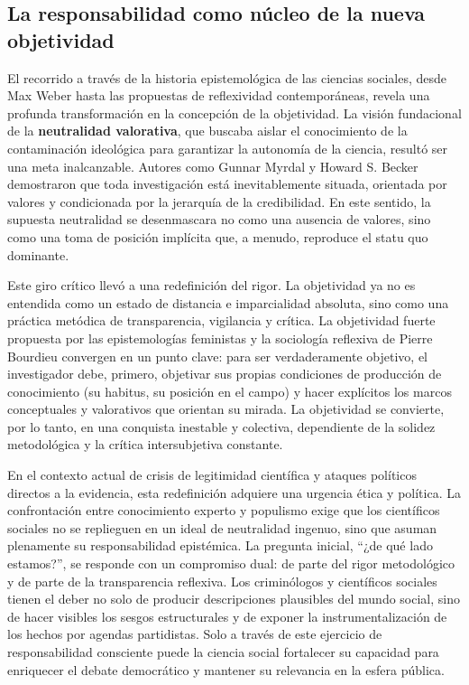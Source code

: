 \documentclass[
  spanish,
  letterpaper,
  DIV=11,
  numbers=noendperiod]{scrreprt}
\begin{document}
\subsection{La responsabilidad como núcleo de la nueva
objetividad}\label{la-responsabilidad-como-nuxfacleo-de-la-nueva-objetividad}

El recorrido a través de la historia epistemológica de las ciencias
sociales, desde Max Weber hasta las propuestas de reflexividad
contemporáneas, revela una profunda transformación en la concepción de
la objetividad. La visión fundacional de la \textbf{neutralidad
valorativa}, que buscaba aislar el conocimiento de la contaminación
ideológica para garantizar la autonomía de la ciencia, resultó ser una
meta inalcanzable. Autores como Gunnar Myrdal y Howard S. Becker
demostraron que toda investigación está inevitablemente situada,
orientada por valores y condicionada por la jerarquía de la
credibilidad. En este sentido, la supuesta neutralidad se desenmascara
no como una ausencia de valores, sino como una toma de posición
implícita que, a menudo, reproduce el statu quo dominante.

Este giro crítico llevó a una redefinición del rigor. La objetividad ya
no es entendida como un estado de distancia e imparcialidad absoluta,
sino como una práctica metódica de transparencia, vigilancia y crítica.
La objetividad fuerte propuesta por las epistemologías feministas y la
sociología reflexiva de Pierre Bourdieu convergen en un punto clave:
para ser verdaderamente objetivo, el investigador debe, primero,
objetivar sus propias condiciones de producción de conocimiento (su
habitus, su posición en el campo) y hacer explícitos los marcos
conceptuales y valorativos que orientan su mirada. La objetividad se
convierte, por lo tanto, en una conquista inestable y colectiva,
dependiente de la solidez metodológica y la crítica intersubjetiva
constante.

En el contexto actual de crisis de legitimidad científica y ataques
políticos directos a la evidencia, esta redefinición adquiere una
urgencia ética y política. La confrontación entre conocimiento experto y
populismo exige que los científicos sociales no se replieguen en un
ideal de neutralidad ingenuo, sino que asuman plenamente su
responsabilidad epistémica. La pregunta inicial, ``¿de qué lado
estamos?'', se responde con un compromiso dual: de parte del rigor
metodológico y de parte de la transparencia reflexiva. Los criminólogos
y científicos sociales tienen el deber no solo de producir descripciones
plausibles del mundo social, sino de hacer visibles los sesgos
estructurales y de exponer la instrumentalización de los hechos por
agendas partidistas. Solo a través de este ejercicio de responsabilidad
consciente puede la ciencia social fortalecer su capacidad para
enriquecer el debate democrático y mantener su relevancia en la esfera
pública.
\end{document}
